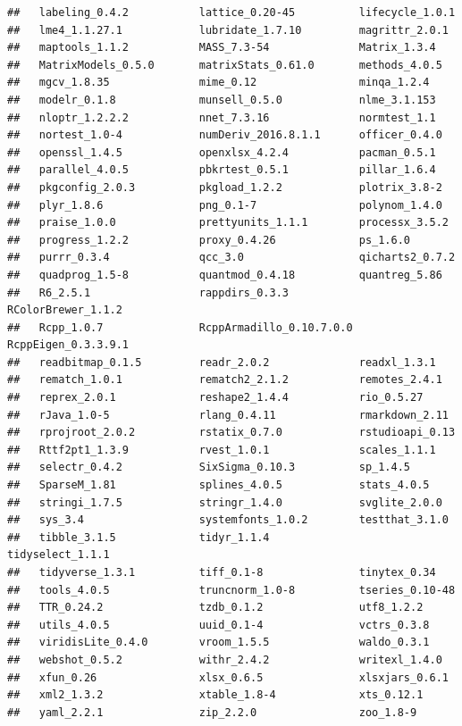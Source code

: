 \documentclass[
]{book}
\begin{document}
\begin{verbatim}
##   labeling_0.4.2           lattice_0.20-45          lifecycle_1.0.1         
##   lme4_1.1.27.1            lubridate_1.7.10         magrittr_2.0.1          
##   maptools_1.1.2           MASS_7.3-54              Matrix_1.3.4            
##   MatrixModels_0.5.0       matrixStats_0.61.0       methods_4.0.5           
##   mgcv_1.8.35              mime_0.12                minqa_1.2.4             
##   modelr_0.1.8             munsell_0.5.0            nlme_3.1.153            
##   nloptr_1.2.2.2           nnet_7.3.16              normtest_1.1            
##   nortest_1.0-4            numDeriv_2016.8.1.1      officer_0.4.0           
##   openssl_1.4.5            openxlsx_4.2.4           pacman_0.5.1            
##   parallel_4.0.5           pbkrtest_0.5.1           pillar_1.6.4            
##   pkgconfig_2.0.3          pkgload_1.2.2            plotrix_3.8-2           
##   plyr_1.8.6               png_0.1-7                polynom_1.4.0           
##   praise_1.0.0             prettyunits_1.1.1        processx_3.5.2          
##   progress_1.2.2           proxy_0.4.26             ps_1.6.0                
##   purrr_0.3.4              qcc_3.0                  qicharts2_0.7.2         
##   quadprog_1.5-8           quantmod_0.4.18          quantreg_5.86           
##   R6_2.5.1                 rappdirs_0.3.3           RColorBrewer_1.1.2      
##   Rcpp_1.0.7               RcppArmadillo_0.10.7.0.0 RcppEigen_0.3.3.9.1     
##   readbitmap_0.1.5         readr_2.0.2              readxl_1.3.1            
##   rematch_1.0.1            rematch2_2.1.2           remotes_2.4.1           
##   reprex_2.0.1             reshape2_1.4.4           rio_0.5.27              
##   rJava_1.0-5              rlang_0.4.11             rmarkdown_2.11          
##   rprojroot_2.0.2          rstatix_0.7.0            rstudioapi_0.13         
##   Rttf2pt1_1.3.9           rvest_1.0.1              scales_1.1.1            
##   selectr_0.4.2            SixSigma_0.10.3          sp_1.4.5                
##   SparseM_1.81             splines_4.0.5            stats_4.0.5             
##   stringi_1.7.5            stringr_1.4.0            svglite_2.0.0           
##   sys_3.4                  systemfonts_1.0.2        testthat_3.1.0          
##   tibble_3.1.5             tidyr_1.1.4              tidyselect_1.1.1        
##   tidyverse_1.3.1          tiff_0.1-8               tinytex_0.34            
##   tools_4.0.5              truncnorm_1.0-8          tseries_0.10-48         
##   TTR_0.24.2               tzdb_0.1.2               utf8_1.2.2              
##   utils_4.0.5              uuid_0.1-4               vctrs_0.3.8             
##   viridisLite_0.4.0        vroom_1.5.5              waldo_0.3.1             
##   webshot_0.5.2            withr_2.4.2              writexl_1.4.0           
##   xfun_0.26                xlsx_0.6.5               xlsxjars_0.6.1          
##   xml2_1.3.2               xtable_1.8-4             xts_0.12.1              
##   yaml_2.2.1               zip_2.2.0                zoo_1.8-9
\end{verbatim}
\end{document}

